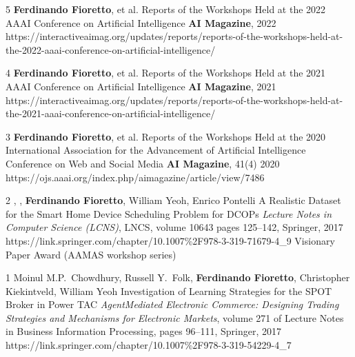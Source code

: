 \begin{pubs}
\journalentry
	{5} %
	{{\bf Ferdinando Fioretto}, et al.} 
	{Reports of the Workshops Held at the 2022 AAAI Conference on Artificial Intelligence}
	{{\bf AI Magazine}, 2022}
	{https://interactiveaimag.org/updates/reports/reports-of-the-workshops-held-at-the-2022-aaai-conference-on-artificial-intelligence/}

\journalentry
	{4} %
	{{\bf Ferdinando Fioretto}, et al.} 
	{Reports of the Workshops Held at the 2021 AAAI Conference on Artificial Intelligence}
	{{\bf AI Magazine}, 2021}
	{https://interactiveaimag.org/updates/reports/reports-of-the-workshops-held-at-the-2021-aaai-conference-on-artificial-intelligence/}

\journalentry
	{3} %
	{{\bf Ferdinando Fioretto}, et al.} 
	{Reports of the Workshops Held at the 2020 International Association for the Advancement of Artificial Intelligence Conference on Web and Social Media}
	{{\bf AI Magazine},  41(4) 2020}
	{https://ojs.aaai.org/index.php/aimagazine/article/view/7486}

\journalentryAwd
	{2} %
	{, , {\bf Ferdinando Fioretto}, William Yeoh, Enrico Pontelli}
	{A Realistic Dataset for the Smart Home Device Scheduling Problem for DCOPs}
	{\emph{Lecture Notes in Computer Science (LCNS)}, LNCS, volume 10643 pages 125--142, Springer, 2017}
	{https://link.springer.com/chapter/10.1007\%2F978-3-319-71679-4\_9}
	{Visionary Paper Award}
	{(AAMAS workshop series)}

\journalentry
	{1} %
	{Moinul M.P.~Chowdhury, Russell Y.~Folk, {\bf Ferdinando Fioretto}, Christopher Kiekintveld, William Yeoh}
	{Investigation of Learning Strategies for the SPOT Broker in Power TAC}
	{\emph{AgentMediated Electronic Commerce: Designing Trading Strategies and Mechanisms for Electronic Markets}, volume 271 of Lecture Notes in Business Information Processing, 
	    pages 96–111, Springer, 2017}
    {https://link.springer.com/chapter/10.1007\%2F978-3-319-54229-4\_7}
\end{pubs}


